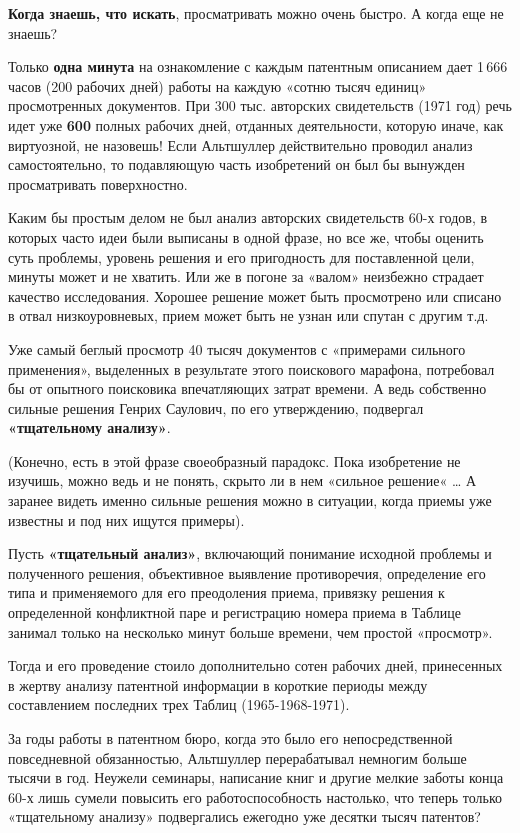 \documentclass[11pt,a4paper]{article}
\begin{document}
\textbf{Когда знаешь, что искать}, просматривать можно очень быстро. А когда
еще не знаешь?

Только \textbf{одна минута} на ознакомление с каждым патентным описанием дает
1\,666 часов (200 рабочих дней) работы на каждую «сотню тысяч единиц»
просмотренных документов. При 300 тыс. авторских свидетельств (1971 год) речь
идет уже \textbf{600} полных рабочих дней, отданных деятельности, которую
иначе, как виртуозной, не назовешь! Если Альтшуллер действительно проводил
анализ самостоятельно, то подавляющую часть изобретений он был бы вынужден
просматривать поверхностно.

Каким бы простым делом не был анализ авторских свидетельств 60-х годов, в
которых часто идеи были выписаны в одной фразе, но все же, чтобы оценить суть
проблемы, уровень решения и его пригодность для поставленной цели, минуты
может и не хватить. Или же в погоне за «валом» неизбежно страдает качество
исследования. Хорошее решение может быть просмотрено или списано в отвал
низкоуровневых, прием может быть не узнан или спутан с другим т.д.

Уже самый беглый просмотр 40 тысяч документов с «примерами сильного
применения», выделенных в результате этого поискового марафона, потребовал бы
от опытного поисковика впечатляющих затрат времени. А ведь собственно сильные
решения Генрих Саулович, по его утверждению, подвергал \textbf{«тщательному
  анализу»}.

(Конечно, есть в этой фразе своеобразный парадокс. Пока изобретение не
изучишь, можно ведь и не понять, скрыто ли в нем «сильное решение« … А заранее
видеть именно сильные решения можно в ситуации, когда приемы уже известны и
под них ищутся примеры).

Пусть \textbf{«тщательный анализ»}, включающий понимание исходной проблемы и
полученного решения, объективное выявление противоречия, определение его типа
и применяемого для его преодоления приема, привязку решения к определенной
конфликтной паре и регистрацию номера приема в Таблице занимал только на
несколько минут больше времени, чем простой «просмотр».

Тогда и его проведение стоило дополнительно сотен рабочих дней, принесенных в
жертву анализу патентной информации в короткие периоды между составлением
последних трех Таблиц (1965-1968-1971).

За годы работы в патентном бюро, когда это было его непосредственной
повседневной обязанностью, Альтшуллер перерабатывал немногим больше тысячи в
год. Неужели семинары, написание книг и другие мелкие заботы конца 60-х лишь
сумели повысить его работоспособность настолько, что теперь только
«тщательному анализу» подвергались ежегодно уже десятки тысяч патентов?
\end{document}
